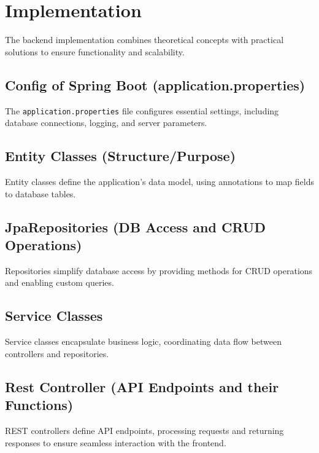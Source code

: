 \Author{\daAuthorThree}


    \section{Implementation}
    The backend implementation combines theoretical concepts with practical solutions to ensure functionality and scalability.

    \subsection{Config of Spring Boot (application.properties)}
    The \texttt{application.properties} file configures essential settings, including database connections, logging, and server parameters.

    \subsection{Entity Classes (Structure/Purpose)}
    Entity classes define the application's data model, using annotations to map fields to database tables.

    \subsection{JpaRepositories (DB Access and CRUD Operations)}
    Repositories simplify database access by providing methods for CRUD operations and enabling custom queries.

    \subsection{Service Classes}
    Service classes encapsulate business logic, coordinating data flow between controllers and repositories.

    \subsection{Rest Controller (API Endpoints and their Functions)}
    REST controllers define API endpoints, processing requests and returning responses to ensure seamless interaction with the frontend.
